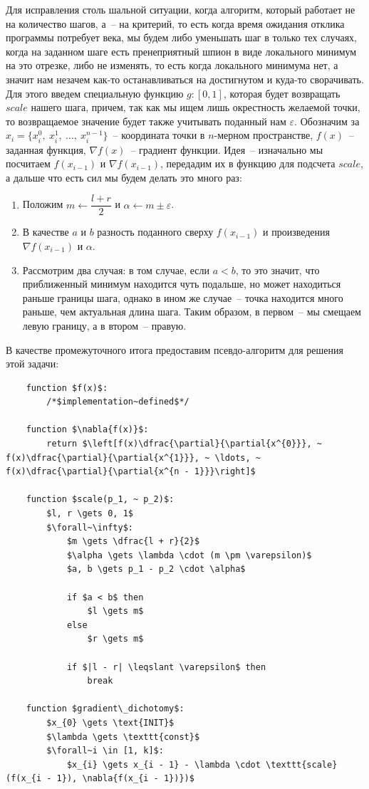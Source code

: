 \documentclass[12pt, a4paper, oneside, final]{article}
\begin{document}
	Для исправления столь шальной ситуации, когда алгоритм, который работает не на количество шагов, а~-- на критерий, то есть когда время ожидания отклика программы потребует века, мы будем либо уменьшать шаг в только тех случаях, когда на заданном шаге есть пренеприятный шпион в виде локального минимум на это отрезке, либо не изменять, то есть когда локального минимума нет, а значит нам незачем как-то останавливаться на достигнутом и куда-то сворачивать. Для этого введем специальную функцию $g : [0, 1]$, которая будет возвращать $scale$ нашего шага, причем, так как мы ищем лишь окрестность желаемой точки, то возвращаемое значение будет также учитывать поданный нам $\varepsilon$. Обозначим за $x_{i} = \{x^0_{i}, ~ x^1_{i}, ~ \ldots, ~ x^{n - 1}_i\}$~-- координата точки в $n$-мерном пространстве, $f(x)$~-- заданная функция, $\nabla{f(x)}$~-- градиент функции. Идея~-- изначально мы посчитаем $f(x_{i - 1})$ и $\nabla{f(x_{i - 1})}$, передадим их в функцию для подсчета $scale$, а дальше что есть сил мы будем делать это много раз:
	\begin{enumerate}[(1)]
		\item Положим $m \gets \dfrac{l + r}{2}$ и $\alpha \gets m \pm \varepsilon$.
		\item В качестве $a$ и $b$ разность поданного сверху $f(x_{i - 1})$ и произведения $\nabla{f(x_{i - 1})}$ и $\alpha$.
		\item Рассмотрим два случая: в том случае, если $a < b$, то это значит, что приближенный минимум находится чуть подальше, но может находиться раньше границы шага, однако в ином же случае~-- точка находится много раньше, чем актуальная длина шага. Таким образом, в первом~-- мы смещаем левую границу, а в втором~-- правую.
	\end{enumerate}
	В качестве промежуточного итога предоставим псевдо-алгоритм для решения этой задачи:
	\begin{lstlisting}
	function $f(x)$:
		/*$implementation~defined$*/

	function $\nabla{f(x)}$:
		return $\left[f(x)\dfrac{\partial}{\partial{x^{0}}}, ~ f(x)\dfrac{\partial}{\partial{x^{1}}}, ~ \ldots, ~ f(x)\dfrac{\partial}{\partial{x^{n - 1}}}\right]$

	function $scale(p_1, ~ p_2)$:
		$l, r \gets 0, 1$
		$\forall~\infty$:
			$m \gets \dfrac{l + r}{2}$
			$\alpha \gets \lambda \cdot (m \pm \varepsilon)$
			$a, b \gets p_1 - p_2 \cdot \alpha$

			if $a < b$ then
				$l \gets m$
			else
				$r \gets m$

			if $|l - r| \leqslant \varepsilon$ then
				break

	function $gradient\_dichotomy$:
		$x_{0} \gets \text{INIT}$
		$\lambda \gets \texttt{const}$
		$\forall~i \in [1, k]$:
			$x_{i} \gets x_{i - 1} - \lambda \cdot \texttt{scale}(f(x_{i - 1}), \nabla{f(x_{i - 1})})$
	\end{lstlisting}
\end{document}
